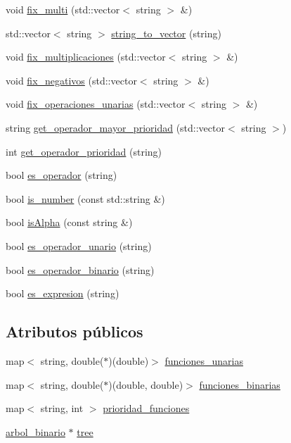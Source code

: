 \begin{DoxyCompactItemize}
\item 
void \hyperlink{class_interpretador_a50bdb39c90e92e8f92be71443339774c}{fix\+\_\+multi} (std\+::vector$<$ string $>$ \&)
\item 
std\+::vector$<$ string $>$ \hyperlink{class_interpretador_a131a8526e7eca0c2ebd36d5fd9f116df}{string\+\_\+to\+\_\+vector} (string)
\item 
void \hyperlink{class_interpretador_a56b129ed3210f94fafed102eeb68f633}{fix\+\_\+multiplicaciones} (std\+::vector$<$ string $>$ \&)
\item 
void \hyperlink{class_interpretador_aa89bcf45e7c07b712ca0d63e32ef098b}{fix\+\_\+negativos} (std\+::vector$<$ string $>$ \&)
\item 
void \hyperlink{class_interpretador_aa95dd4e2fe49213ff6d445f3fb69881d}{fix\+\_\+operaciones\+\_\+unarias} (std\+::vector$<$ string $>$ \&)
\item 
string \hyperlink{class_interpretador_a87e389afc6775a51deaea1c5730e9ecc}{get\+\_\+operador\+\_\+mayor\+\_\+prioridad} (std\+::vector$<$ string $>$)
\item 
int \hyperlink{class_interpretador_a2032902283b06008db2cad20050ecced}{get\+\_\+operador\+\_\+prioridad} (string)
\item 
bool \hyperlink{class_interpretador_a99c39d578dc93c193c7d5de164985e35}{es\+\_\+operador} (string)
\item 
bool \hyperlink{class_interpretador_a54276960e2c38150c3f337447414b2f0}{is\+\_\+number} (const std\+::string \&)
\item 
bool \hyperlink{class_interpretador_a7029c0ad73ed9ab55de3033073b169db}{is\+Alpha} (const string \&)
\item 
bool \hyperlink{class_interpretador_a2c47cecd7282c404a4fc858a303d9230}{es\+\_\+operador\+\_\+unario} (string)
\item 
bool \hyperlink{class_interpretador_aa376909fd2d36b41124af047055e5f34}{es\+\_\+operador\+\_\+binario} (string)
\item 
bool \hyperlink{class_interpretador_a256caa85f2333b3d5f98b50755fde5c8}{es\+\_\+expresion} (string)
\end{DoxyCompactItemize}
\subsection*{Atributos públicos}
\begin{DoxyCompactItemize}
\item 
map$<$ string, double($\ast$)(double)$>$ \hyperlink{class_interpretador_a69b4c0a967ebb3300bdd1a0d768be777}{funciones\+\_\+unarias}
\item 
map$<$ string, double($\ast$)(double, double)$>$ \hyperlink{class_interpretador_aae54d44f01e4c4b755ae133819b49d78}{funciones\+\_\+binarias}
\item 
map$<$ string, int $>$ \hyperlink{class_interpretador_a5ba0987e974f7eaba6376e0539466788}{prioridad\+\_\+funciones}
\item 
\hyperlink{classarbol__binario}{arbol\+\_\+binario} $\ast$ \hyperlink{class_interpretador_a95ae1c37ba98e88aeffec2807eb3f332}{tree}
\end{DoxyCompactItemize}



